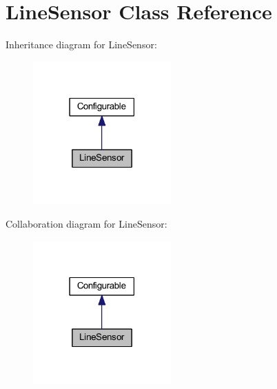 \hypertarget{class_line_sensor}{
\section{\-Line\-Sensor \-Class \-Reference}
\label{class_line_sensor}
}


\-Inheritance diagram for \-Line\-Sensor\-:\nopagebreak
\begin{figure}[H]
\begin{center}
\leavevmode
\includegraphics[width=150pt]{class_line_sensor__inherit__graph}
\end{center}
\end{figure}


\-Collaboration diagram for \-Line\-Sensor\-:\nopagebreak
\begin{figure}[H]
\begin{center}
\leavevmode
\includegraphics[width=150pt]{class_line_sensor__coll__graph}
\end{center}
\end{figure}
